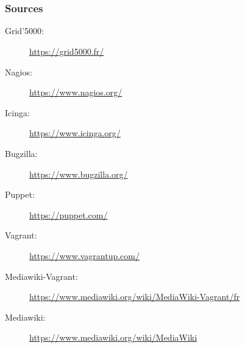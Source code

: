 \documentclass[11pt,compress]{beamer}
\begin{document}
\section*{}
\begin{frame}
\frametitle{Sources}
\begin{scriptsize}
\begin{description}
\item[Grid'5000:]\url{https://grid5000.fr/}
\item[Nagios:]\url{https://www.nagios.org/}
\item[Icinga:]\url{https://www.icinga.org/}
\item[Bugzilla:]\url{https://www.bugzilla.org/}
\item[Puppet:]\url{https://puppet.com/}
\item[Vagrant:]\url{https://www.vagrantup.com/}
\item[Mediawiki-Vagrant:]\url{https://www.mediawiki.org/wiki/MediaWiki-Vagrant/fr}
\item[Mediawiki:]\url{https://www.mediawiki.org/wiki/MediaWiki}
\end{description}
\end{scriptsize}
\end{frame}
\end{document}
